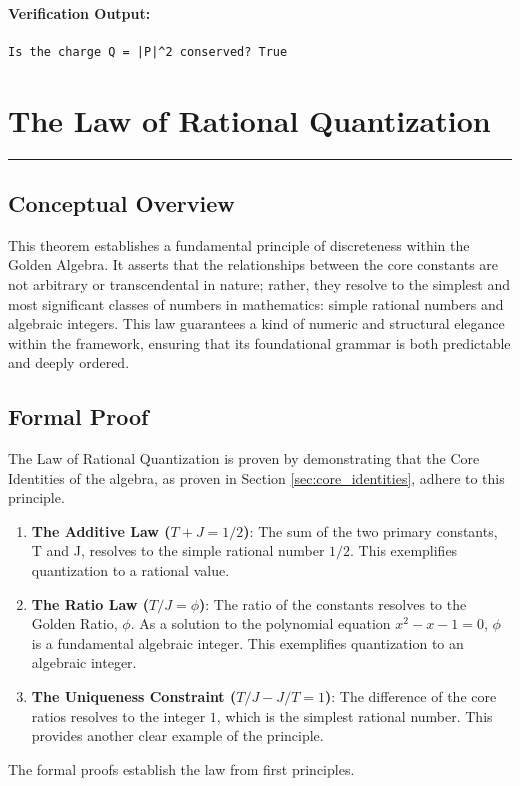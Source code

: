 \paragraph{Verification Output:}
\begin{verbatim}
Is the charge Q = |P|^2 conserved? True
\end{verbatim}


\section{The Law of Rational Quantization}
\label{sec:rational_quantization}
\hrule
\vspace{1em}


\subsection{Conceptual Overview}
This theorem establishes a fundamental principle of discreteness within the Golden Algebra. It asserts that the relationships between the core constants are not arbitrary or transcendental in nature; rather, they resolve to the simplest and most significant classes of numbers in mathematics: simple rational numbers and algebraic integers. This law guarantees a kind of numeric and structural elegance within the framework, ensuring that its foundational grammar is both predictable and deeply ordered.

\subsection{Formal Proof}
The Law of Rational Quantization is proven by demonstrating that the Core Identities of the algebra, as proven in Section \ref{sec:core_identities}, adhere to this principle.

\begin{enumerate}
    \item \textbf{The Additive Law (\(T+J=1/2\))}: The sum of the two primary constants, T and J, resolves to the simple rational number $1/2$. This exemplifies quantization to a rational value.

    \item \textbf{The Ratio Law (\(T/J=\phi\))}: The ratio of the constants resolves to the Golden Ratio, $\phi$. As a solution to the polynomial equation $x^2 - x - 1 = 0$, $\phi$ is a fundamental algebraic integer. This exemplifies quantization to an algebraic integer.

    \item \textbf{The Uniqueness Constraint (\(T/J - J/T = 1\))}: The difference of the core ratios resolves to the integer $1$, which is the simplest rational number. This provides another clear example of the principle.
\end{enumerate}
The formal proofs establish the law from first principles.


